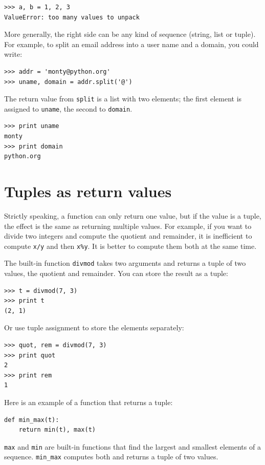 \documentclass[10pt]{book}
\begin{document}
\begin{verbatim}
>>> a, b = 1, 2, 3
ValueError: too many values to unpack
\end{verbatim}
%
More generally, the right side can be any kind of sequence
(string, list or tuple).  For example, to split an email address
into a user name and a domain, you could write:

\begin{verbatim}
>>> addr = 'monty@python.org'
>>> uname, domain = addr.split('@')
\end{verbatim}
%
The return value from {\tt split} is a list with two elements;
the first element is assigned to {\tt uname}, the second to
{\tt domain}.

\begin{verbatim}
>>> print uname
monty
>>> print domain
python.org
\end{verbatim}
%

\section{Tuples as return values}

Strictly speaking, a function can only return one value, but
if the value is a tuple, the effect is the same as returning
multiple values.  For example, if you want to divide two integers
and compute the quotient and remainder, it is inefficient to
compute {\tt x/y} and then {\tt x\%y}.  It is better to compute
them both at the same time.

The built-in function {\tt divmod} takes two arguments and
returns a tuple of two values, the quotient and remainder.
You can store the result as a tuple:

\begin{verbatim}
>>> t = divmod(7, 3)
>>> print t
(2, 1)
\end{verbatim}
%
Or use tuple assignment to store the elements separately:

\begin{verbatim}
>>> quot, rem = divmod(7, 3)
>>> print quot
2
>>> print rem
1
\end{verbatim}
%
Here is an example of a function that returns a tuple:

\begin{verbatim}
def min_max(t):
    return min(t), max(t)
\end{verbatim}
%
{\tt max} and {\tt min} are built-in functions that find
the largest and smallest elements of a sequence.  \verb"min_max"
computes both and returns a tuple of two values.
\end{document}
